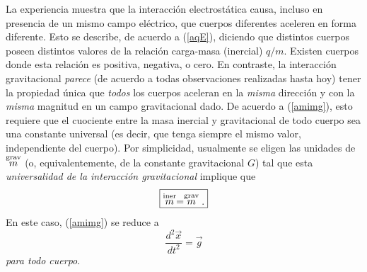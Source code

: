 La experiencia muestra que la interacción electrostática causa, incluso en presencia de un mismo campo eléctrico, que cuerpos diferentes aceleren en forma diferente. Esto se describe, de acuerdo a (\ref{aqE}), diciendo que distintos cuerpos poseen distintos valores de la relación carga-masa (inercial) $q/m$. Existen cuerpos donde esta relación es positiva, negativa, o cero. En contraste, la interacción gravitacional \textit{parece} (de acuerdo a todas observaciones realizadas hasta hoy) tener la propiedad única que \textit{todos} los cuerpos aceleran en la \textit{misma} dirección y con la \textit{misma} magnitud en un campo gravitacional dado. De acuerdo a (\ref{amimg}), esto requiere que el cuociente entre la masa inercial y gravitacional de todo cuerpo sea una constante universal (es decir, que tenga siempre el mismo valor, independiente del cuerpo). Por simplicidad, usualmente se eligen las unidades de $\stackrel{\rm grav}{m}$ (o, equivalentemente, de la constante gravitacional $G$) tal que esta \textit{universalidad de la interacción gravitacional} implique que
\begin{equation}
\boxed{\stackrel{\rm iner}{m}=\stackrel{\rm grav}{m}.}
\end{equation}
En este caso, (\ref{amimg}) se reduce a
\begin{equation}\label{ag}
\frac{d^2\vec{x}}{dt^2}=\vec{g}
\end{equation}
\textit{para todo cuerpo}.

